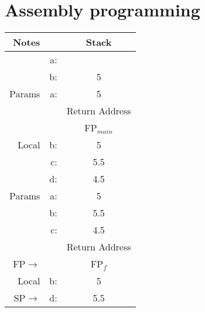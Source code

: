 \section{Assembly programming}
\begin{table}[H]
\centering
	\begin{tabular}{|r|r||c|}
	\hline
	Notes	& & Stack \\ \hline
			& a: & 		\\ \hline		
			& b: & 5	\\ \hline
	Params	& a: & 5	\\ \hline	
			& &Return Address  \\ \hline
			& &FP$_{main}$ \\ \hline
	Local	& b: & 5	\\ \hline
			& c: & 5.5	\\ \hline
			& d: & 4.5	\\ \hline
	Params	& a: & 5	\\ \hline
			& b: & 5.5	\\ \hline
			& c: & 4.5	\\ \hline
			& &Return Address \\ \hline
	FP$\rightarrow$& &FP$_f$ 	\\ \hline
	Local	& b: & 5	\\ \hline
	SP$\rightarrow$	& d: & 5.5	\\ \hline
	\end{tabular}
\end{table}

